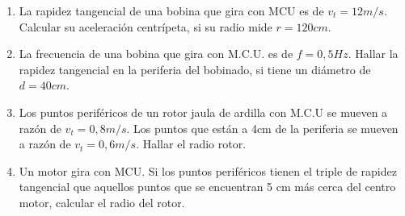 \documentclass[../main]{subfiles}
\begin{document}
\begin{enumerate}
{Siendo:

$a_c$: Aceleración centrípeta $[m/s^2]$.

$v_t$: Velocidad tangencial $[m/s]$.

$\omega:$ Velocidad angular $[rad/s]$

$r:$ Radio. [m]
}


    
    \item La rapidez tangencial de una bobina que gira con MCU es de $v_t=12 m/s$. Calcular su aceleración centrípeta, si su radio mide $r=120 cm$.

    \item La frecuencia de una bobina que gira con M.C.U. es de $f=0,5Hz$. Hallar la rapidez tangencial en la periferia del bobinado, si tiene un diámetro de $d=40cm$.
    

    
\item Los puntos periféricos de un rotor jaula de ardilla con M.C.U se mueven a razón de $v_t=0,8 m/s$. Los puntos que están a 4cm de la periferia se
mueven a razón de $v_t=0,6 m/s$. Hallar el radio rotor. 

\item Un motor gira con MCU. Si los puntos
periféricos tienen el triple de rapidez tangencial
que aquellos puntos que se encuentran 5 cm
más cerca del centro motor, calcular el radio
del rotor. 

\end{enumerate}
\newpage
\end{document}
